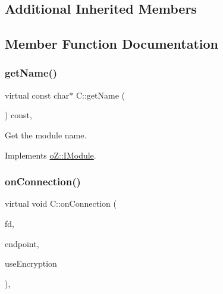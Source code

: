 \subsection*{Additional Inherited Members}


\subsection{Member Function Documentation}
\mbox{\label{class_c_ad5f4b90909e9c14fc2601adc54ffdfa6}} 
\subsubsection{\texorpdfstring{getName()}{getName()}}
{\footnotesize\ttfamily virtual const char$\ast$ C\+::get\+Name (\begin{DoxyParamCaption}\item[{void}]{ }\end{DoxyParamCaption}) const\hspace{0.3cm}{\ttfamily [inline]}, {\ttfamily [virtual]}}



Get the module name. 



Implements \mbox{\hyperlink{classo_z_1_1_i_module_af41d45158fd28e1bd86a34e25f5282d6}{o\+Z\+::\+I\+Module}}.

\mbox{\label{class_c_a9d2de0b00320ee2011d7e326346d00cb}} 
\subsubsection{\texorpdfstring{onConnection()}{onConnection()}}
{\footnotesize\ttfamily virtual void C\+::on\+Connection (\begin{DoxyParamCaption}\item[{const \mbox{\hyperlink{namespaceo_z_acbb8d05709257b6414b3979597f88c0c}{File\+Descriptor}}}]{fd,  }\item[{const}]{endpoint,  }\item[{const bool}]{use\+Encryption }\end{DoxyParamCaption})\hspace{0.3cm}{\ttfamily [inline]}, {\ttfamily [virtual]}}



